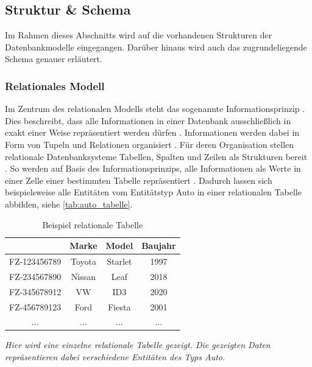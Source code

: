 \subsection{Struktur \& Schema}
\label{datenmodelle:structure}
Im Rahmen dieses Abschnitts wird auf die vorhandenen Strukturen der Datenbankmodelle eingegangen. Darüber hinaus wird auch das zugrundeliegende Schema genauer erläutert. 

\subsubsection{Relationales Modell}
\label{datenmodelle:structure:relational}
Im Zentrum des relationalen Modells steht das sogenannte Informationsprinzip \cite{rdbms_history}. Dies beschreibt, dass alle Informationen in einer Datenbank ausschließlich in exakt einer Weise repräsentiert werden dürfen \cite{codd_relational_model}. Informationen werden dabei in Form von Tupeln und Relationen organisiert \cite{codd_relational_model}. Für deren Organisation stellen relationale Datenbanksysteme Tabellen, Spalten und Zeilen als Strukturen bereit \cite{rdbms_history}. So werden auf Basis des Informationsprinzips, alle Informationen als Werte in einer Zelle einer bestimmten Tabelle repräsentiert \cite{rdbms_history}. Dadurch lassen sich beispielsweise alle Entitäten vom Entitätstyp Auto in einer relationalen Tabelle abbilden, siehe \autoref{tab:auto_tabelle}. 

\begin{table}[ht]
    \centering
    \begin{tabular}{c|c|c|c}
    \hline
    \rowcolor[HTML]{EFEFEF} 
    \multicolumn{1}{l|}{\cellcolor[HTML]{EFEFEF}\textbf{Fahrzeugnummer}} & \multicolumn{1}{l|}{\cellcolor[HTML]{EFEFEF}\textbf{Marke}} & \multicolumn{1}{l|}{\cellcolor[HTML]{EFEFEF}\textbf{Model}} & \multicolumn{1}{l}{\cellcolor[HTML]{EFEFEF}\textbf{Baujahr}} \\ \hline
    FZ-123456789 & Toyota & Starlet & 1997 \\
    FZ-234567890 & Nissan & Leaf & 2018 \\
    FZ-345678912 & VW & ID3 & 2020 \\
    FZ-456789123 & Ford & Fiesta & 2001 \\
    ... & ... & ... & ... \\ \hline
    \end{tabular}
    \caption{Beispiel relationale Tabelle}
    \vspace{0.1em}
    \textit{Hier wird eine einzelne relationale Tabelle gezeigt. Die gezeigten Daten repräsentieren dabei verschiedene Entitäten des Typs Auto.}
    \label{tab:auto_tabelle}
\end{table}

